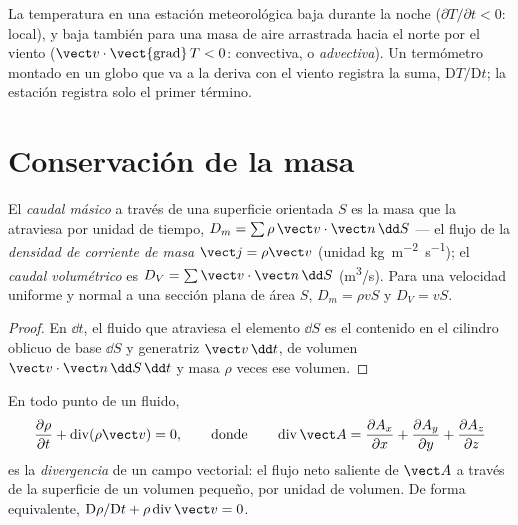 \begin{example}\label{ex:b2:fluid-kinematics:weather}
La temperatura en una estación meteorológica baja durante la noche ($\partial T/
\partial t < 0$: local), y baja también para una masa de aire arrastrada hacia
el norte por el viento ($\vect v\cdot\operatorname{\vect{grad}}T < 0$: convectiva, o
\emph{advectiva}). Un termómetro montado en un globo que va a la deriva con
el viento registra la suma, $\mathrm DT/\mathrm Dt$; la estación registra
solo el primer término.
\end{example}

\section{Conservación de la masa}

\begin{definition}\label{def:b2:fluid-kinematics:flowrate}
El \emph{caudal másico} a través de una superficie orientada $S$ es la
masa que la atraviesa por unidad de tiempo, $D_m = \sum\rho\,\vect v\cdot\vect n\,\dd S$ ---
el flujo de la \emph{densidad de corriente de masa} $\vect j = \rho\vect v$
(unidad \unit{kg.m^{-2}.s^{-1}}); el \emph{caudal volumétrico} es $D_V = \sum\vect v
\cdot\vect n\,\dd S$ (\unit{m^3/s}). Para una velocidad uniforme y normal a
una sección plana de área $S$, $D_m = \rho vS$ y $D_V = vS$.
\end{definition}

\begin{proof}
En $\dd t$, el fluido que atraviesa el elemento $\dd S$ es el contenido en
el cilindro oblicuo de base $\dd S$ y generatriz $\vect v\,\dd t$, de
volumen $\vect v\cdot\vect n\,\dd S\,\dd t$ y masa $\rho$ veces ese volumen.
\end{proof}

\begin{theorem}\label{thm:b2:fluid-kinematics:continuity}
En todo punto de un fluido,
\[
\frac{\partial\rho}{\partial t} + \operatorname{div}(\rho\vect v) = 0 ,
\qquad\text{donde}\qquad
\operatorname{div}\vect A = \frac{\partial A_x}{\partial x} + \frac{\partial A_y}{\partial y} +
\frac{\partial A_z}{\partial z}
\]
es la \emph{divergencia} de un campo vectorial: el flujo neto saliente de
$\vect A$ a través de la superficie de un volumen pequeño, por unidad de
volumen. De forma equivalente, $\mathrm D\rho/\mathrm Dt + \rho\operatorname{div}\vect v = 0$.
\end{theorem}

